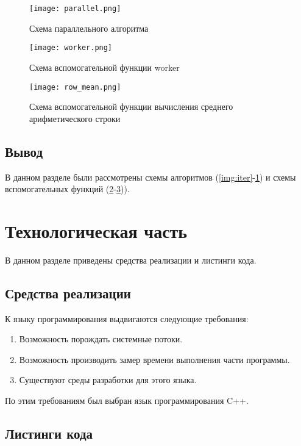 \begin{figure}
    \centering
    \texttt{[image: parallel.png]}
    \caption{Схема параллельного алгоритма}
    \label{img:parallel}
\end{figure}

\begin{figure}
    \centering
    \texttt{[image: worker.png]}
    \caption{Схема вспомогательной функции worker}
    \label{img:worker}
\end{figure}

\begin{figure}
    \centering
    \texttt{[image: row\_mean.png]}
    \caption{Схема вспомогательной функции вычисления среднего арифметического строки}
    \label{img:row_mean}
\end{figure}

\clearpage
\subsection{Вывод}

В данном разделе были рассмотрены схемы алгоритмов (\ref{img:iter}-\ref{img:parallel}) и схемы вспомогательных функций (\ref{img:worker}-\ref{img:row_mean})).

\section{Технологическая часть}

В данном разделе приведены средства реализации и листинги кода.

\subsection{Средства реализации}

К языку программирования выдвигаются следующие требования:

\begin{enumerate}
	\item Возможность порождать системные потоки.
	\item Возможность производить замер времени выполнения части программы.
	\item Существуют среды разработки для этого языка.
\end{enumerate}

По этим требованиям был выбран язык программирования C++.

\subsection{Листинги кода}

